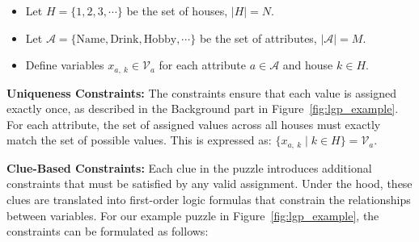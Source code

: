 \vspace{-0.2cm}
\begin{itemize}[noitemsep,topsep=0pt,leftmargin=3em]
    \item Let $H = \{1, 2, 3, \cdots\}$ be the set of houses, $|H| = N$.
    \item Let $\mathcal{A} = \{\text{Name}, \text{Drink}, \text{Hobby}, \cdots \}$ be the set of attributes, $|\mathcal{A}| = M$.
    \item Define variables $x_{a,\ k} \in \mathcal{V}_{a}$ for each attribute $a \in \mathcal{A}$ and house $k \in H$.
\end{itemize}
\vspace{-0.2cm}
 


\textbf{Uniqueness Constraints:}
The constraints ensure that each value is assigned exactly once, as described in the Background part in Figure~\ref{fig:lgp_example}.
For each attribute, the set of assigned values across all houses must exactly match the set of possible values. This is expressed as:  $\{ x_{a,\ k} \mid k \in H \} = \mathcal{V}_{a}$.




\textbf{Clue-Based Constraints:} 
Each clue in the puzzle introduces additional constraints that must be satisfied by any valid assignment. Under the hood, these clues are translated into first-order logic formulas that constrain the relationships between variables. For our example puzzle in Figure~\ref{fig:lgp_example}, the constraints can be formulated as follows:
 
